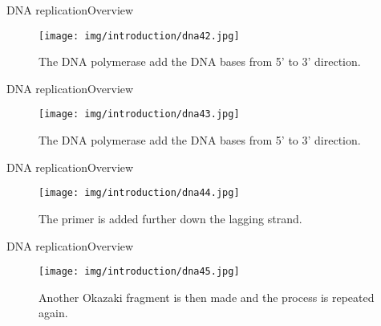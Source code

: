 \documentclass[10pt]{beamer}
\newcommand{\1}{
	\setbeamertemplate{background}{
		\texttt{[image: img/1]}
		\tikz[overlay] \fill[fill opacity=0.75,fill=white] (0,0) rectangle (-\paperwidth,\paperheight);
	}
}
\begin{document}
\begin{frame}{DNA replication}{Overview}
	\begin{figure}[]
		\centering
		\texttt{[image: img/introduction/dna42.jpg]}
		\label{img:mot2}
		\caption{The DNA polymerase add the DNA bases from 5' to 3' direction. }
	\end{figure}
\end{frame}

\begin{frame}{DNA replication}{Overview}
	\begin{figure}[]
		\centering
		\texttt{[image: img/introduction/dna43.jpg]}
		\label{img:mot2}
		\caption{The DNA polymerase add the DNA bases from 5' to 3' direction. }
	\end{figure}
\end{frame}


\begin{frame}{DNA replication}{Overview}
	\begin{figure}[]
		\centering
		\texttt{[image: img/introduction/dna44.jpg]}
		\label{img:mot2}
		\caption{The primer is added further down the lagging strand. }
	\end{figure}
\end{frame}

\begin{frame}{DNA replication}{Overview}
	\begin{figure}[]
		\centering
		\texttt{[image: img/introduction/dna45.jpg]}
		\label{img:mot2}
		\caption{Another Okazaki fragment is then made and the process is repeated again. }
	\end{figure}
\end{frame}
\end{document}
